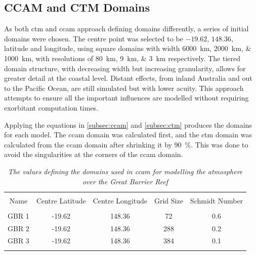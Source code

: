 \subsection{CCAM and CTM Domains}
\label{subsec:domains}

As both \gls{ctm} and \gls{ccam} approach defining domains differently, a series of initial domains were chosen. The centre point was selected to be $-19.62$, $148.36$, latitude and longitude, using square domains with width \SIlist[list-units = single]{6000;2000;1000}{\km}, with resolutions of \SIlist[list-units = single]{80;9;3}{\km} respectively. The tiered domain structure, with decreasing width but increasing granularity, allows for greater detail at the coastal level. Distant effects, from inland Australia and out to the Pacific Ocean, are still simulated but with lower acuity. This approach attempts to ensure all the important influences are modelled without requiring exorbitant computation times.

Applying the equations in \cref{subsec:ccam} and \cref{subsec:ctm} produces the domains for each model. The \gls{ccam} domain was calculated first, and the \gls{ctm} domain was calculated from the \gls{ccam} domain after shrinking it by \SI{90}{\percent}. This was done to avoid the singularities at the corners of the \gls{ccam} domain.

\begin{table}[tbh!]
	\caption{\textsl{The values defining the domains used in \gls{ccam} for modelling the atmosphere over the Great Barrier Reef}}
	\centering
		\begin{tabular}{c c c c c} \\
			\hline \\ [-1ex]
			Name & Centre Latitude & Centre Longitude & Grid Size & Schmidt Number \\ [1ex]
			\hline \\ [-1ex]
			GBR 1 & -19.62 & 148.36 & 72 & 0.6 \\ 
 			GBR 2 & -19.62 & 148.36 & 288 & 0.2 \\
			GBR 3 & -19.62 & 148.36 & 384 & 0.1 \\ [1ex]
			\hline \\
		\end{tabular}
	\label{tab:ccamdomain}
\end{table}

